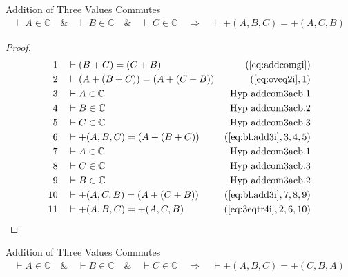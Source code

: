 \begin{lemma} Addition of Three Values Commutes
\begin{align}
\vdash A \in \mathbb{C}\quad\&\quad \vdash B \in \mathbb{C}\quad\&\quad \vdash
    C \in \mathbb{C}\quad\Rightarrow\quad \vdash +( A , B , C ) = +( A , C , B
    )\label{eq:bl.addcom3acb}\tag{bl.addcom3acb}
\end{align}
\end{lemma}

\begin{proof}
\begin{align}
  1 &&  & \vdash ( B + C ) = ( C + B )&(\mbox{\ref{eq:addcomgi}})\notag
  \\ 2 &&  & \vdash ( A + ( B + C ) ) = ( A + ( C + B ) )&(\mbox{\ref{eq:oveq2i}},1)\notag
  \\ 3 &&  & \vdash A \in
\mathbb{C}&\text{Hyp~addcom3acb.1}\notag%
  \\ 4 &&  & \vdash B \in
\mathbb{C}&\text{Hyp~addcom3acb.2}\notag%
  \\ 5 &&  & \vdash C \in
\mathbb{C}&\text{Hyp~addcom3acb.3}\notag%
  \\ 6 &&  & \vdash +( A , B , C ) = ( A + ( B + C ) )&(\mbox{\ref{eq:bl.add3i}},3,4,5)\notag
  \\ 7 &&  & \vdash A \in
\mathbb{C}&\text{Hyp~addcom3acb.1}\notag%
  \\ 8 &&  & \vdash C \in
\mathbb{C}&\text{Hyp~addcom3acb.3}\notag%
  \\ 9 &&  & \vdash B \in
\mathbb{C}&\text{Hyp~addcom3acb.2}\notag%
  \\ 10 &&  & \vdash +( A , C , B ) = ( A + ( C + B ) )&(\mbox{\ref{eq:bl.add3i}},7,8,9)\notag
  \\ 11 &&  & \vdash +( A , B , C ) = +( A , C , B )&(\mbox{\ref{eq:3eqtr4i}},2,6,10)\notag
\end{align}
\end{proof}

\begin{lemma} Addition of Three Values Commutes
\begin{align}
\vdash A \in \mathbb{C}\quad\&\quad \vdash B \in \mathbb{C}\quad\&\quad \vdash
    C \in \mathbb{C}\quad\Rightarrow\quad \vdash +( A , B , C ) = +( C , B , A
    )\label{eq:bl.addcom3ac}\tag{bl.addcom3ac}
\end{align}
\end{lemma}

